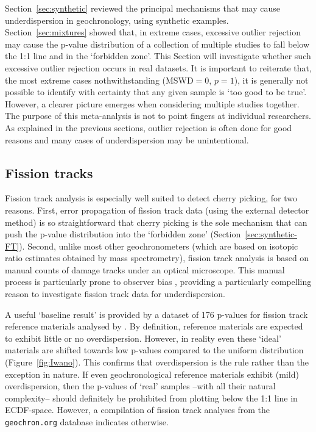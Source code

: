 \documentclass[gchron, manuscript]{copernicus}
\begin{document}
Section~\ref{sec:synthetic} reviewed the principal mechanisms that may
cause underdispersion in geochronology, using synthetic examples.
Section~\ref{sec:mixtures} showed that, in extreme cases, excessive
outlier rejection may cause the p-value distribution of a collection
of multiple studies to fall below the 1:1 line and in the `forbidden
zone'. This Section will investigate whether such excessive outlier
rejection occurs in real datasets. It is important to reiterate that,
the most extreme cases nothwithstanding (MSWD$ = 0$, $p = 1$), it is
generally not possible to identify with certainty that any given
sample is `too good to be true'. However, a clearer picture emerges
when considering multiple studies together. The purpose of this
meta-analysis is not to point fingers at individual researchers. As
explained in the previous sections, outlier rejection is often done
for good reasons and many cases of underdispersion may be
unintentional.

\subsection{Fission tracks}\label{sec:FT}

Fission track analysis is especially well suited to detect cherry
picking, for two reasons.  First, error propagation of fission track
data (using the external detector method) is so straightforward
\citep{green1981b} that cherry picking is the sole mechanism that can
push the p-value distribution into the `forbidden zone'
(Section~\ref{sec:synthetic-FT}).  Second, unlike most other
geochronometers (which are based on isotopic ratio estimates obtained
by mass spectrometry), fission track analysis is based on manual
counts of damage tracks under an optical microscope. This manual
process is particularly prone to observer bias \citep{tamer2025},
providing a particularly compelling reason to investigate fission
track data for underdispersion.\medskip

A useful `baseline result' is provided by a dataset of 176 p-values
for fission track reference materials analysed by \cite{iwano2018}. By
definition, reference materials are expected to exhibit little or no
overdispersion. However, in reality even these `ideal' materials are
shifted towards low p-values compared to the uniform distribution
(Figure~\ref{fig:Iwano}). This confirms that overdispersion is the
rule rather than the exception in nature.  If even geochronological
reference materials exhibit (mild) overdispersion, then the p-values
of `real' samples --with all their natural complexity-- should
definitely be prohibited from plotting below the 1:1 line in
ECDF-space.  However, a compilation of fission track analyses from the
\texttt{geochron.org} database indicates otherwise.\medskip
\end{document}
